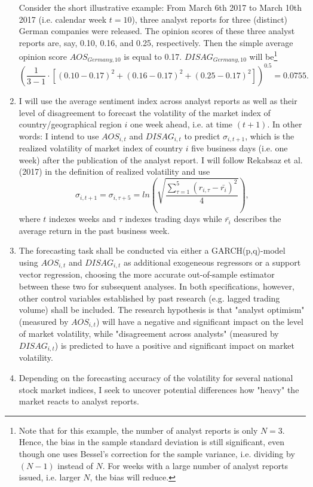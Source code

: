 \documentclass[12pt, a4paper]{article}
\begin{document}
\begin{enumerate}
Consider the short illustrative example: From March 6th 2017 to March 10th 2017 (i.e. calendar week $t=10$), three analyst reports for three (distinct) German companies were released. The opinion scores of these three analyst reports are, say, 0.10, 0.16, and 0.25, respectively. Then the simple average opinion score $AOS_{Germany,10}$ is equal to 0.17. $DISAG_{Germany,10}$ will be\footnote{Note that for this example, the number of analyst reports is only $N=3$. Hence, the bias in the sample standard deviation is still significant, even though one uses Bessel's correction for the sample variance, i.e. dividing by $(N-1)$ instead of $N$. For weeks with a large number of analyst reports issued, i.e. larger $N$, the bias will reduce.} $$\left( \frac{1}{3-1}\cdot \left[ (0.10-0.17)^2 + (0.16-0.17)^2 + (0.25-0.17)^2 \right] \right)^{0.5} = 0.0755.$$
\item I will use the average sentiment index across analyst reports  as well as their level of disagreement to forecast the volatility of the market index of country/geographical region $i$ one week ahead, i.e. at time $(t+1)$. In other words: I intend to use $AOS_{i,t}$ and $DISAG_{i,t}$ to predict $\sigma_{i,t+1}$, which is the realized volatility of market index of country $i$ five business days (i.e. one week) after the publication of the analyst report. I will follow Rekabsaz et al. (2017) in the definition of realized volatility and use $$\sigma_{i,t+1} = \sigma_{i,\tau+5} = ln \left( \sqrt{\frac{\sum_{\tau=1}^{5} (r_{i,\tau} - \bar{r_i}) ^2}{4}} \right),$$ where $t$ indexes weeks and $\tau$ indexes trading days while $\bar{r_i}$ describes the average return in the past business week. 
\item The forecasting task shall be conducted via either a GARCH(p,q)-model using  $AOS_{i,t}$ and $DISAG_{i,t}$ as additional exogeneous regressors or  a support vector regression, choosing the more accurate out-of-sample estimator between these two for subsequent analyses. In both specifications, however, other control variables established by past research (e.g. lagged trading volume) shall be included. The research hypothesis is that "analyst optimism" (measured by $AOS_{i,t}$) will have a negative and significant impact on the level of market volatility, while "disagreement across analysts" (measured by $DISAG_{i,t}$) is predicted to have a positive and significant impact on market volatility. 
\item Depending on the forecasting accuracy of the volatility for several national stock market indices, I seek to uncover potential differences how "heavy" the market reacts to analyst reports.\\
\end{enumerate}
\end{document}
